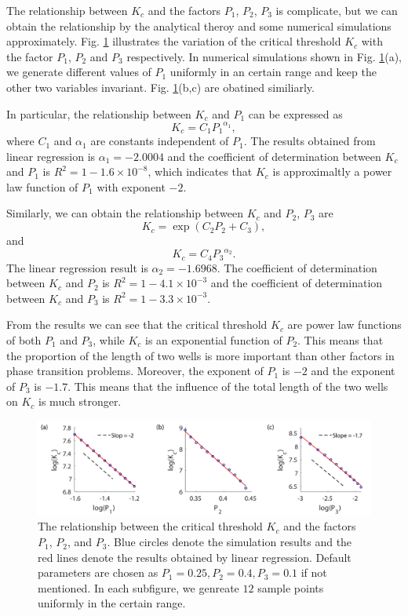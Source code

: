 \documentclass[a4paper,11pt]{article}
\begin{document}
The relationship between $K_c$ and the factors $P_1$, $P_2$, $P_3$ is complicate, but we can obtain the relationship by the analytical theroy and some numerical simulations approximately. Fig. \ref{fig6} illustrates the variation of the critical threshold $K_c$ with the factor $P_1$, $P_2$ and $P_3$ respectively. In numerical simulations shown in Fig. \ref{fig6}(a), we generate different values of $P_1$ uniformly in an certain range and keep the other two variables invariant. Fig. \ref{fig6}(b,c) are obatined similiarly.

In particular, the relationship between $K_c$ and $P_1$ can be expressed as
\begin{equation}
K_c = C_1 {P_1}^{\alpha_1},
\end{equation}
where $C_1$ and $\alpha_1$ are constants independent of $P_1$. The results obtained from linear regression is $\alpha_1 = -2.0004$ and the coefficient of determination between $K_c$ and $P_1$ is $R^2 = 1 - 1.6 \times 10^{-8}$, which indicates that $K_c$ is approximaltly a power law function of $P_1$ with exponent $-2$.

Similarly, we can obtain the relationship between $K_c$ and $P_2$, $P_3$ are
\begin{equation}
K_c = \exp(C_2 P_2 + C_3),
\end{equation}
and
\begin{equation}
K_c = C_4 {P_3}^{\alpha_2}.
\end{equation}
The linear regression result is $\alpha_2 = -1.6968$. The coefficient of determination between $K_c$ and $P_2$ is $R^2 = 1 - 4.1 \times 10^{-3}$ and the coefficient of determination between $K_c$ and $P_3$ is $R^2 = 1 - 3.3 \times 10^{-3}$.

From the results we can see that the critical threshold $K_c$ are power law functions of both $P_1$ and $P_3$, while $K_c$ is an exponential function of $P_2$. This means that the proportion of the length of two wells is more important than other factors in phase transition problems. Moreover, the exponent of $P_1$ is $-2$ and the exponent of $P_3$ is $-1.7$. This means that the influence of the total length of the two wells on $K_c$ is much stronger.

\begin{figure}
\centering
\includegraphics[width=\linewidth]{Fig6}
\caption{The relationship between the critical threshold $K_c$ and the factors $P_1$, $P_2$, and $P_3$. Blue circles denote the simulation results and the red lines denote the results obtained by linear regression. Default parameters are chosen as $P_1 = 0.25, P_2 = 0.4, P_3 = 0.1$ if not mentioned. In each subfigure, we genreate $12$ sample points uniformly in the certain range.}
\label{fig6}
\end{figure}
\end{document}
